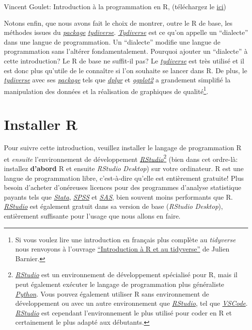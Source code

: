 \documentclass[
]{book}
\begin{document}
Vincent Goulet: Introduction à la programmation en R, (téléchargez le \href{https://cran.r-project.org/doc/contrib/Goulet_introduction_programmation_R.pdf}{ici})

Notons enfin, que nous avons fait le choix de montrer, outre le R de base, les méthodes issues du \protect\hyperlink{packages}{\emph{package}} \href{https://www.tidyverse.org/}{\emph{tydiverse}}. \href{https://www.tidyverse.org/}{\emph{Tydiverse}} est ce qu'on appelle un ``dialecte'' dans une langue de programmation. Un ``dialecte'' modifie une langue de programmation sans l'altérer fondamentalement. Pourquoi ajouter un ``dialecte'' à cette introduction? Le R de base ne suffit-il pas? Le \href{https://www.tidyverse.org/}{\emph{tydiverse}} est très utilisé et il est donc plus qu'utile de le connaître si l'on souhaite se lancer dans R. De plus, le \href{https://www.tidyverse.org/}{\emph{tydiverse}} avec ses \protect\hyperlink{packages}{\emph{package}} tels que \href{https://dplyr.tidyverse.org/}{\emph{dplyr}} et \href{https://ggplot2.tidyverse.org/}{\emph{ggplot2}} a grandement simplifié la manipulation des données et la réalisation de graphiques de qualité\footnote{Si vous voulez lire une introduction en français plus complète au \emph{tidyverse} nous renvoyons à l'ouvrage \href{https://juba.github.io/tidyverse/}{``Introduction à R et au tidyverse''} de Julien Barnier.}.

\hypertarget{installer-r}{%
\section{Installer R}\label{installer-r}}

Pour suivre cette introduction, veuillez installer le langage de programmation R et \emph{ensuite} l'environnement de développement \href{https://posit.co/}{\emph{RStudio}}\footnote{\href{https://posit.co/}{\emph{RStudio}} est un environnement de développement spécialisé pour R, mais il peut également exécuter le langage de programmation plus généraliste \href{https://www.python.org/}{\emph{Python}}. Vous pouvez également utiliser R sans environnement de développement ou avec un autre environnement que \href{https://posit.co/}{\emph{RStudio}}, tel que \href{https://code.visualstudio.com/}{\emph{VSCode}}. \href{https://posit.co/}{\emph{RStudio}} est cependant l'environnement le plus utilisé pour coder en R et certainement le plus adapté aux débutants.} (bien dans cet ordre-là: installez \textbf{d'abord} R et ensuite \emph{RStudio Desktop}) sur votre ordinateur. R est une langue de programmation libre, c'est-à-dire qu'elle est entièrement gratuite! Plus besoin d'acheter d'onéreuses licences pour des programmes d'analyse statistique payants tels que \href{https://www.stata.com/}{\emph{Stata}}, \href{https://www.ibm.com/fr-fr/products/spss-statistics}{\emph{SPSS}} et \href{https://www.sas.com/}{\emph{SAS}}, bien souvent moins performants que R. \href{https://posit.co/}{\emph{RStudio}} est également gratuit dans sa version de base (\emph{RStudio Desktop}), entièrement suffisante pour l'usage que nous allons en faire.
\end{document}
